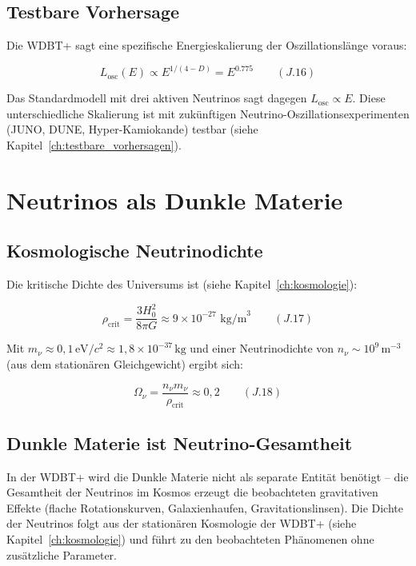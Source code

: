 \subsection{Testbare Vorhersage}
\label{sub:neutrino_oszillation_vorhersage}

Die WDBT+ sagt eine spezifische Energieskalierung der Oszillationslänge voraus:

\[
L_{\text{osc}}(E) \propto E^{1/(4-D)} = E^{0.775} \qquad (J.16)
\]

Das Standardmodell mit drei aktiven Neutrinos sagt dagegen $L_{\text{osc}} \propto E$. 
Diese unterschiedliche Skalierung ist mit zukünftigen Neutrino-Oszillationsexperimenten 
(JUNO, DUNE, Hyper-Kamiokande) testbar (siehe Kapitel~\ref{ch:testbare_vorhersagen}).

\section{Neutrinos als Dunkle Materie}
\label{app:neutrino_oszillation_dunkle_materie}

\subsection{Kosmologische Neutrinodichte}
\label{sub:neutrino_oszillation_dichte}

Die kritische Dichte des Universums ist (siehe Kapitel~\ref{ch:kosmologie}):

\[
\rho_{\text{crit}} = \frac{3H_0^2}{8\pi G} \approx 9 \times 10^{-27} \text{ kg/m}^3 \qquad (J.17)
\]

Mit $m_{\nu} \approx 0,1\,\text{eV}/c^2 \approx 1,8 \times 10^{-37}\,\text{kg}$ und einer 
Neutrinodichte von $n_{\nu} \sim 10^9\,\text{m}^{-3}$ (aus dem stationären Gleichgewicht) 
ergibt sich:

\[
\Omega_{\nu} = \frac{n_{\nu} m_{\nu}}{\rho_{\text{crit}}} \approx 0,2 \qquad (J.18)
\]

\subsection{Dunkle Materie ist Neutrino-Gesamtheit}
\label{sub:neutrino_oszillation_identitaet_dm}

In der WDBT+ wird die Dunkle Materie nicht als separate Entität benötigt – die 
Gesamtheit der Neutrinos im Kosmos erzeugt die beobachteten gravitativen Effekte 
(flache Rotationskurven, Galaxienhaufen, Gravitationslinsen). Die Dichte der Neutrinos 
folgt aus der stationären Kosmologie der WDBT+ (siehe Kapitel~\ref{ch:kosmologie}) und führt zu den beobachteten 
Phänomenen ohne zusätzliche Parameter.

